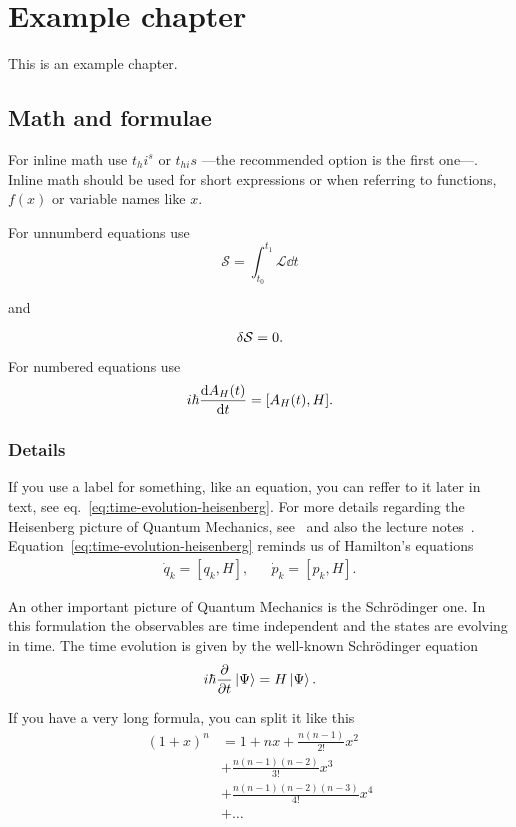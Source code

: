 \chapter{Example chapter}
\label{chap:ex-ch}

This is an example chapter. 
\section{Math and formulae}
For inline math use \(t_hi^s\) or $t_{hi}s$ ---the recommended option is the first one---.
Inline math should be used for short expressions
or when referring to functions, \(f(x)\) or variable names like $x$.

For unnumberd equations use
\[
\mathcal{S} = \int_{t_0}^{t_1} \mathcal{L} \dd{t}
\]

and

\begin{equation*}
\var \mathcal{S} = 0.
\end{equation*}

For numbered equations use
\begin{equation}
\label{eq:time-evolution-heisenberg}
i \hbar \dv{A_H(t)}{t} = \comm{A_H(t)}{H}.
\end{equation}

\subsection{Details}

If you use a label for something, like an equation, you can reffer to it later in text, see eq.~\eqref{eq:time-evolution-heisenberg}.
For more details regarding the Heisenberg picture of Quantum Mechanics, see~\cite{Dirac1967, Sakurai2011} and also the
lecture notes~\cite{Baran, Zus}. Equation~\eqref{eq:time-evolution-heisenberg} reminds us of Hamilton's equations
\begin{align*}
  \dot{q}_k = [q_k,H], && \dot{p}_k = [p_k,H].
\end{align*}

An other important picture of Quantum Mechanics is the Schrödinger one. In this formulation the observables are time
independent and the states are evolving in time. The time evolution is given by the well-known Schrödinger equation
\[
  i \hbar \pdv{t} \ket{\Psi} = H \ket{\Psi}.
\]

If you have a very long formula, you can split it like this
\begin{equation}
\label{eq:long}
\begin{split}
\left(1+x\right)^n  &=  1 + nx + \frac{n\left(n-1\right)}{2!}x^2 \\
 &+ \frac{n\left(n-1\right)\left(n-2\right)}{3!}x^3 \\
 &+ \frac{n\left(n-1\right)\left(n-2\right)\left(n-3\right)}{4!}x^4 \\
 &+ \ldots
\end{split}
\end{equation}

